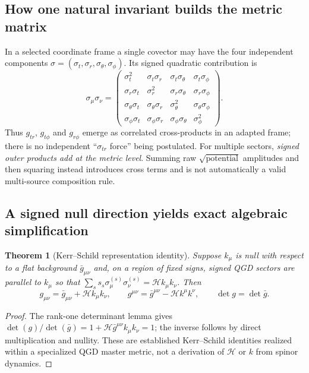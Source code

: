 \documentclass[11pt,a4paper]{article}
\newtheorem{theorem}{Theorem}[section]
\begin{document}
\subsection{How one natural invariant builds the metric matrix}
In a selected coordinate frame a single covector may have the four independent components
$\sigma=(\sigma_t,\sigma_r,\sigma_\theta,\sigma_\phi)$. Its signed quadratic contribution is
\begin{equation}\label{eq:outer-matrix}
\sigma_\mu\sigma_\nu=
\begin{pmatrix}
\sigma_t^2 & \sigma_t\sigma_r & \sigma_t\sigma_\theta & \sigma_t\sigma_\phi\\
\sigma_r\sigma_t & \sigma_r^2 & \sigma_r\sigma_\theta & \sigma_r\sigma_\phi\\
\sigma_\theta\sigma_t & \sigma_\theta\sigma_r & \sigma_\theta^2 & \sigma_\theta\sigma_\phi\\
\sigma_\phi\sigma_t & \sigma_\phi\sigma_r & \sigma_\phi\sigma_\theta & \sigma_\phi^2
\end{pmatrix}.
\end{equation}
Thus $g_{tr}$, $g_{t\phi}$ and $g_{r\phi}$ emerge as correlated cross-products in an adapted frame; there is no independent ``$\sigma_{tr}$ force'' being postulated. For multiple sectors, \emph{signed outer products add at the metric level}. Summing raw $\sqrt{\text{potential}}$ amplitudes and then squaring instead introduces cross terms and is not automatically a valid multi-source composition rule.

\subsection{A signed null direction yields exact algebraic simplification}
\begin{theorem}[Kerr--Schild representation identity]\label{thm:null}
Suppose $k_\mu$ is null with respect to a flat background $\bar g_{\mu\nu}$ and, on a region of fixed signs, signed QGD sectors are parallel to $k_\mu$ so that $\sum_s s_s\sigma_\mu^{(s)}\sigma_\nu^{(s)}=\mathcal H k_\mu k_\nu$. Then
\begin{equation}\label{eq:ks-identity}
 g_{\mu\nu}=\bar g_{\mu\nu}+\mathcal H k_\mu k_\nu,
\qquad
 g^{\mu\nu}=\bar g^{\mu\nu}-\mathcal H k^\mu k^\nu,
\qquad \det g=\det\bar g.
\end{equation}
\end{theorem}
\begin{proof}
The rank-one determinant lemma gives $\det(g)/\det(\bar g)=1+\mathcal H\bar g^{\mu\nu}k_\mu k_\nu=1$; the inverse follows by direct multiplication and nullity. These are established Kerr--Schild identities realized within a specialized QGD master metric, not a derivation of $\mathcal H$ or $k$ from spinor dynamics.
\end{proof}
\end{document}

